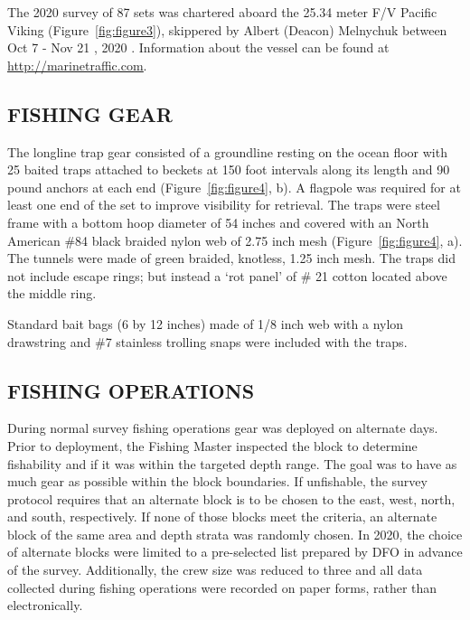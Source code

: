 \documentclass[12pt]{article}\usepackage[]{graphicx}\usepackage[]{color}
\begin{document}
The 2020 survey of 87 sets was chartered aboard the 25.34 meter F/V Pacific Viking (Figure~\ref{fig:figure3}), skippered by Albert (Deacon) Melnychuk between Oct 7 - Nov 21 , 2020 . Information about the vessel can be found at \href{http://marinetraffic.com}{\underline{http://marinetraffic.com}}.

\hypertarget{fishing-gear}{%
\subsection{FISHING GEAR}\label{fishing-gear}}

The longline trap gear consisted of a groundline resting on the ocean floor with 25 baited traps attached to beckets at 150 foot intervals along its length and 90 pound anchors at each end (Figure~\ref{fig:figure4}, b). A flagpole was required for at least one end of the set to improve visibility for retrieval. The traps were steel frame with a bottom hoop diameter of 54 inches and covered with an North American \#84 black braided nylon web of 2.75 inch mesh (Figure~\ref{fig:figure4}, a). The tunnels were made of green braided, knotless, 1.25 inch mesh. The traps did not include escape rings; but instead a `rot panel' of \# 21 cotton located above the middle ring.

Standard bait bags (6 by 12 inches) made of 1/8 inch web with a nylon drawstring and \#7 stainless trolling snaps were included with the traps.

\hypertarget{fishing-operations}{%
\subsection{FISHING OPERATIONS}\label{fishing-operations}}

During normal survey fishing operations gear was deployed on alternate days. Prior to deployment, the Fishing Master inspected the block to determine fishability and if it was within the targeted depth range. The goal was to have as much gear as possible within the block boundaries. If unfishable, the survey protocol requires that an alternate block is to be chosen to the east, west, north, and south, respectively. If none of those blocks meet the criteria, an alternate block of the same area and depth strata was randomly chosen. In 2020, the choice of alternate blocks were limited to a pre-selected list prepared by DFO in advance of the survey. Additionally, the crew size was reduced to three and all data collected during fishing operations were recorded on paper forms, rather than electronically.
\end{document}
